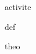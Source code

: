 \documentclass[12pt,a4paper]{article}
\begin{document}
\begin{rounbox}{activite}
\lipsum[1]
\end{rounbox}
\begin{rounbox}[red]{def}
\lipsum[1]
\end{rounbox}
\begin{rounbox}[lime]{theo}
\lipsum[1]
\end{rounbox}
\end{document}
